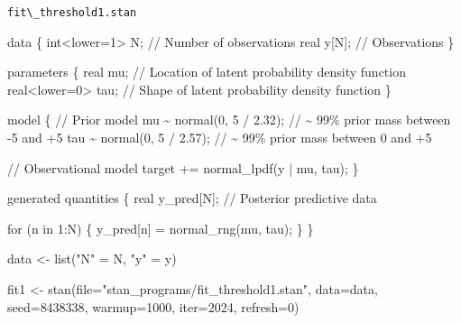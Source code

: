 \documentclass[
  letterpaper,
  DIV=11,
  numbers=noendperiod]{scrartcl}
\newenvironment{Shaded}{\begin{snugshade}}{\end{snugshade}}
\newcommand{\AttributeTok}[1]{\textcolor[rgb]{0.40,0.45,0.13}{#1}}
\newcommand{\CommentTok}[1]{\textcolor[rgb]{0.37,0.37,0.37}{#1}}
\newcommand{\ControlFlowTok}[1]{\textcolor[rgb]{0.00,0.23,0.31}{#1}}
\newcommand{\DataTypeTok}[1]{\textcolor[rgb]{0.68,0.00,0.00}{#1}}
\newcommand{\DecValTok}[1]{\textcolor[rgb]{0.68,0.00,0.00}{#1}}
\newcommand{\FloatTok}[1]{\textcolor[rgb]{0.68,0.00,0.00}{#1}}
\newcommand{\FunctionTok}[1]{\textcolor[rgb]{0.28,0.35,0.67}{#1}}
\newcommand{\KeywordTok}[1]{\textcolor[rgb]{0.00,0.23,0.31}{#1}}
\newcommand{\NormalTok}[1]{\textcolor[rgb]{0.00,0.23,0.31}{#1}}
\newcommand{\OtherTok}[1]{\textcolor[rgb]{0.00,0.23,0.31}{#1}}
\newcommand{\StringTok}[1]{\textcolor[rgb]{0.13,0.47,0.30}{#1}}
\begin{document}
\begin{codelisting}

\caption{\texttt{fit\textbackslash\_threshold1.stan}}

\begin{Shaded}
\begin{Highlighting}[]
\KeywordTok{data}\NormalTok{ \{}
  \DataTypeTok{int}\NormalTok{\textless{}}\KeywordTok{lower}\NormalTok{=}\DecValTok{1}\NormalTok{\textgreater{} N; }\CommentTok{// Number of observations}
  \DataTypeTok{real}\NormalTok{ y[N];      }\CommentTok{// Observations}
\NormalTok{\}}

\KeywordTok{parameters}\NormalTok{ \{}
  \DataTypeTok{real}\NormalTok{ mu;           }\CommentTok{// Location of latent probability density function}
  \DataTypeTok{real}\NormalTok{\textless{}}\KeywordTok{lower}\NormalTok{=}\DecValTok{0}\NormalTok{\textgreater{} tau; }\CommentTok{// Shape of latent probability density function}
\NormalTok{\}}

\KeywordTok{model}\NormalTok{ \{}
  \CommentTok{// Prior model}
\NormalTok{  mu \textasciitilde{} normal(}\DecValTok{0}\NormalTok{, }\DecValTok{5}\NormalTok{ / }\FloatTok{2.32}\NormalTok{);     }\CommentTok{// \textasciitilde{} 99\% prior mass between {-}5 and +5}
\NormalTok{  tau \textasciitilde{} normal(}\DecValTok{0}\NormalTok{, }\DecValTok{5}\NormalTok{ / }\FloatTok{2.57}\NormalTok{);    }\CommentTok{// \textasciitilde{} 99\% prior mass between  0 and +5}
  
  \CommentTok{// Observational model}
  \KeywordTok{target +=}\NormalTok{ normal\_lpdf(y | mu, tau);}
\NormalTok{\}}

\KeywordTok{generated quantities}\NormalTok{ \{}
  \DataTypeTok{real}\NormalTok{ y\_pred[N]; }\CommentTok{// Posterior predictive data}

  \ControlFlowTok{for}\NormalTok{ (n }\ControlFlowTok{in} \DecValTok{1}\NormalTok{:N) \{}
\NormalTok{    y\_pred[n] = normal\_rng(mu, tau);}
\NormalTok{  \} }
\NormalTok{\}}
\end{Highlighting}
\end{Shaded}

\end{codelisting}

\begin{Shaded}
\begin{Highlighting}[]
\NormalTok{data }\OtherTok{\textless{}{-}} \FunctionTok{list}\NormalTok{(}\StringTok{"N"} \OtherTok{=}\NormalTok{ N, }\StringTok{"y"} \OtherTok{=}\NormalTok{ y)}

\NormalTok{fit1 }\OtherTok{\textless{}{-}} \FunctionTok{stan}\NormalTok{(}\AttributeTok{file=}\StringTok{"stan\_programs/fit\_threshold1.stan"}\NormalTok{,}
             \AttributeTok{data=}\NormalTok{data, }\AttributeTok{seed=}\DecValTok{8438338}\NormalTok{,}
             \AttributeTok{warmup=}\DecValTok{1000}\NormalTok{, }\AttributeTok{iter=}\DecValTok{2024}\NormalTok{, }\AttributeTok{refresh=}\DecValTok{0}\NormalTok{)}
\end{Highlighting}
\end{Shaded}
\end{document}
